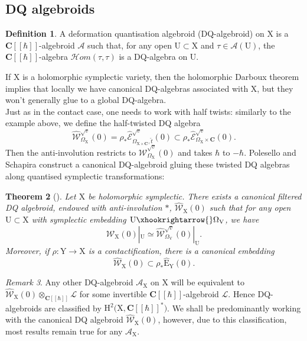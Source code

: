 \documentclass{article}
\theoremstyle{plain}
\newtheorem{theorem}{Theorem}[subsection]   %
\theoremstyle{definition}
\newtheorem{definition}[theorem]{Definition}
\theoremstyle{remark}
\newtheorem{remark}[theorem]{Remark}
\newcommand{\mr}{\mathrm}
\newcommand{\Ww}{\widehat{\mathscr{W}}_{\mr{X}}}
\newcommand{\C}{\mathbf C}
\newcommand{\brak}{[\![\hbar]\!]}
\newcommand{\3}{\vspace{3mm}}
\newcommand{\2}{\vspace{2mm}}
\newcommand{\1}{\vspace{1mm}}
\begin{document}
\subsection{DQ algebroids}
\begin{definition}
 A deformation quantisation algebroid (DQ-algebroid) on $\mr{X}$ is a $\C\brak$-algebroid $\mathscr{A}$ such that, for any open $\mr{U}\subset \mr{X}$ and $\tau \in \mathscr{A}(\mr{U})$, the $\C\brak$-algebra $\mathscr{H}om(\tau,\tau)$ is a DQ-algebra on $\mr{U}$.
\end{definition}
\2
If $\mr{X}$ is a holomorphic symplectic variety, then the holomorphic Darboux theorem implies that locally we have canonical DQ-algebras associated with $\mr{X}$, but they won't generally glue to a global DQ-algebra.\\ Just as in the contact case, one needs to work with half twists: similarly to the example above, we define the half-twisted DQ algebra $$\widehat{\mathscr{W}}^{\sqrt{v}}_{\Omega_\mr{X}}(0)= \rho_{*}\widehat{\mathscr{E}}_{\Omega_{\mr{X}\times \C},\widehat{t}}^{\sqrt{v}}(0)\subset \rho_{*}\widehat{\mathscr{E}}^{\sqrt{v}}_{\Omega_{\mr{X}}\times \C}(0).$$ Then the anti-involution restricts to $\widehat{\mathscr{W}}^{\sqrt{v}}_{\Omega_\mr{X}}(0)$ and takes $\hbar$ to $-\hbar$. Polesello and Schapira \cite{10.1155/S1073792804132819} construct a canonical DQ-algebroid gluing these twisted DQ algebras along quantised symplectic transformations:
\2
\begin{theorem}[\cite{10.1155/S1073792804132819}]
Let $\mr{X}$ be holomorphic symplectic. There exists a canonical filtered DQ algebroid, endowed with anti-involution $*$, $\widehat{\mathscr{W}}_{\mr{X}}(0)$ such that for any open $\mr{U}\subset \mr{X}$ with symplectic embedding $\mr{U}\xhookrightarrow{}\Omega_\mr{V}$, we have $$\widehat{\mathscr{W}}_{\mr{X}}(0)|_\mr{U}\simeq \widehat{\mathscr{W}}^{\sqrt{v}}_{\Omega_\mr{V}}(0)|_\mr{U}.$$Moreover, if $\rho:\mr{Y}\to \mr{X}$ is a contactification, there is a canonical embedding $$\widehat{\mathscr{W}}_{\mr{X}}(0)\subset \rho_*\widehat{\mr{E}}_\mr{Y}(0).$$
\end{theorem}
\begin{remark}
 Any other DQ-algebroid $\mathscr{A}_{\mr{X}}$ on $\mr{X}$ will be equivalent to $\widehat{\mathscr{W}}_{\mr{X}}(0)\otimes_{\C\brak}\mathscr{L}$ for some invertible $\C\brak$-algebroid $\mathscr{L}$. Hence DQ-algebroids are classified by $\mr{H}^{2}\big(\mr{X},\C\brak^{*}\big)$. We shall be predominantly working with the canonical DQ algebroid $\Ww(0)$, however, due to this classification, most results remain true for any $\mathscr{A}_\mr{X}$.
\end{remark}
\end{document}
